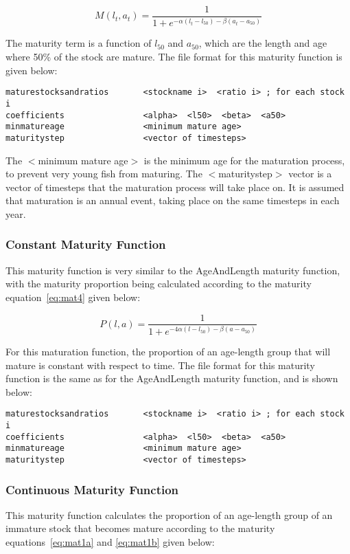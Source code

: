 \documentclass [a4paper, 10pt]{book}
\begin{document}
\begin{equation}\label{eq:mat3b}
M(l_{t},a_{t}) = \frac{1}{1 + e^{-\alpha(l_{t} - l_{50}) - \beta(a_{t} - a_{50})}}
\end{equation}

\bigskip
The maturity term is a function of $l_{50}$ and $a_{50}$, which are the length and age where 50\% of the stock are mature.  The file format for this maturity function is given below:

{\small\begin{verbatim}
maturestocksandratios       <stockname i>  <ratio i> ; for each stock i
coefficients                <alpha>  <l50>  <beta>  <a50>
minmatureage                <minimum mature age>
maturitystep                <vector of timesteps>
\end{verbatim}}

The $<$minimum mature age$>$ is the minimum age for the maturation process, to prevent very young fish from maturing.  The $<$maturitystep$>$ vector is a vector of timesteps that the maturation process will take place on.  It is assumed that maturation is an annual event, taking place on the same timesteps in each year.

\subsubsection{Constant Maturity Function}
This maturity function is very similar to the AgeAndLength maturity function, with the maturity proportion being calculated according to the maturity equation~\ref{eq:mat4} given below:

\begin{equation}\label{eq:mat4}
P(l, a) = \frac{1}{ 1 + e^{-4\alpha(l - l_{50}) - \beta(a - a_{50})}}
\end{equation}

For this maturation function, the proportion of an age-length group that will mature is constant with respect to time.  The file format for this maturity function is the same as for the AgeAndLength maturity function, and is shown below:

{\small\begin{verbatim}
maturestocksandratios       <stockname i>  <ratio i> ; for each stock i
coefficients                <alpha>  <l50>  <beta>  <a50>
minmatureage                <minimum mature age>
maturitystep                <vector of timesteps>
\end{verbatim}}

\subsubsection{Continuous Maturity Function}
This maturity function calculates the proportion of an age-length group of an immature stock that becomes mature according to the maturity equations~\ref{eq:mat1a} and \ref{eq:mat1b} given below:
\end{document}
